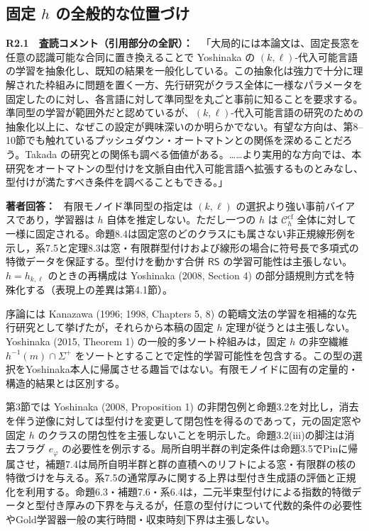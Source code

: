 \documentclass[10pt,a4paper]{ltjsarticle}
\newcommand{\Comment}[1]{\par\medskip\noindent\textbf{#1　査読コメント（引用部分の全訳）：}\ }
\newcommand{\Reply}{\par\noindent\textbf{著者回答：}\ }
\newcommand{\Chcf}{\mathcal C_h^{\mathrm{cf}}}
\newcommand{\RS}{\mathsf{RS}}
\begin{document}
\subsection*{固定 $h$ の全般的な位置づけ}
\Comment{R2.1}
「大局的には本論文は、固定長窓を任意の認識可能な合同に置き換えることで Yoshinaka の $(k,\ell)$-代入可能言語の学習を抽象化し、既知の結果を一般化している。この抽象化は強力で十分に理解された枠組みに問題を置く一方、先行研究がクラス全体に一様なパラメータを固定したのに対し、各言語に対して準同型を丸ごと事前に知ることを要求する。準同型の学習が範囲外だと認めているが、$(k,\ell)$-代入可能言語の研究のための抽象化以上に、なぜこの設定が興味深いのか明らかでない。有望な方向は、第8--10節でも触れているプッシュダウン・オートマトンとの関係を深めることだろう。Takada の研究との関係も調べる価値がある。……より実用的な方向では、本研究をオートマトンの型付けを文脈自由代入可能言語へ拡張するものとみなし、型付けが満たすべき条件を調べることもできる。」

\Reply
有限モノイド準同型の指定は $(k,\ell)$ の選択より強い事前バイアスであり，学習器は $h$ 自体を推定しない。ただし一つの $h$ は $\Chcf$ 全体に対して一様に固定される。命題8.4は固定窓のどのクラスにも属さない非正規線形例を示し，系7.5と定理8.3は窓・有限群型付けおよび線形の場合に符号長で多項式の特徴データを保証する。型付けを動かす合併 $\RS$ の学習可能性は主張しない。$h=h_{k,\ell}$ のときの再構成は Yoshinaka (2008, Section 4) の部分語規則方式を特殊化する（表現上の差異は第4.1節）。

序論には Kanazawa (1996; 1998, Chapters 5, 8) の範疇文法の学習を相補的な先行研究として挙げたが，それらから本稿の固定 $h$ 定理が従うとは主張しない。Yoshinaka (2015, Theorem 1) の一般的多ソート枠組みは，固定 $h$ の非空繊維 $h^{-1}(m)\cap\Sigma^+$ をソートとすることで定性的学習可能性を包含する。この型の選択をYoshinaka本人に帰属させる趣旨ではない。有限モノイドに固有の定量的・構造的結果とは区別する。

第3節では Yoshinaka (2008, Proposition 1) の非閉包例と命題3.2を対比し，消去を伴う逆像に対しては型付けを変更して閉包性を得るのであって，元の固定窓や固定 $h$ のクラスの閉包性を主張しないことを明示した。命題3.2(iii)の脚注は消去フラグ $e_\varphi$ の必要性を例示する。局所自明半群の判定条件は命題3.5でPinに帰属させ，補題7.4は局所自明半群と群の直積へのリフトによる窓・有限群の核の特徴づけを与える。系7.5の通常厚みに関する上界は型付き生成語の評価と正規化を利用する。命題6.3・補題7.6・系6.4は，二元半束型付けによる指数的特徴データと型付き厚みの下界を与えるが，任意の型付けについて代数的条件の必要性やGold学習器一般の実行時間・収束時刻下界は主張しない。
\end{document}
